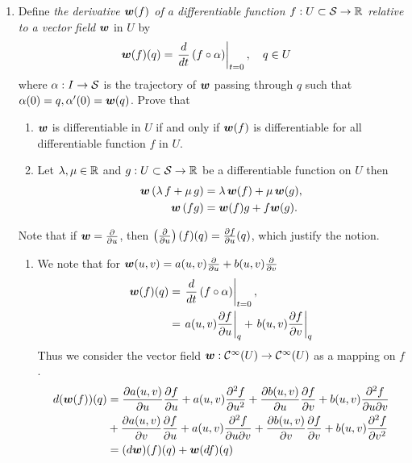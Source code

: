 \documentclass[11pt]{article}
\begin{document}
\begin{enumerate}
\item \begin{example}
Define \emph{the derivative $\boldsymbol{w}(f)$ of a differentiable function $f: U\subset {\mathcal S} \rightarrow {\mathbb R}$ relative to a vector field} $\boldsymbol{w}$ in $U$ by 
\begin{align*}
\boldsymbol{w}(f)(q) &= \left.{\frac{d}{dt}\left(f\circ \alpha\right)}\right\vert_{t=0},\quad q\in U
\end{align*}
where $\alpha: I\rightarrow {\mathcal S}$ is the trajectory of $\boldsymbol{w}$ passing through $q$ such that $\alpha(0) = q, \alpha'(0)=\boldsymbol{w}(q)$. Prove that 
\begin{enumerate}
\item $\boldsymbol{w}$ is differentiable in $U$ if and only if $\boldsymbol{w}(f)$ is differentiable for all differentiable function $f$ in $U$.
\item Let $\lambda, \mu\in {\mathbb R}$ and $g: U\subset {\mathcal S} \rightarrow {\mathbb R}$ be a differentiable function on $U$ then 
\begin{align*}
\boldsymbol{w}\left(\lambda\,f+ \mu\, g\right) &= \lambda\,\boldsymbol{w}(f) + \mu\,\boldsymbol{w}(g),\\
\boldsymbol{w}\left(fg\right) &= \boldsymbol{w}(f)g +f\boldsymbol{w}(g).
\end{align*}
\end{enumerate}
\end{example}
Note that if $\boldsymbol{w} = \frac{\partial }{ \partial u}$, then $\left(\frac{\partial }{ \partial u}\right)(f)(q) = \frac{\partial f}{ \partial u}(q)$, which justify the notion.

\begin{solution}
\begin{enumerate}
\item We note that for $\boldsymbol{w}(u,v) = a(u,v)\frac{\partial }{ \partial u}+ b(u,v)\frac{\partial }{ \partial v}$
\begin{align*}
\boldsymbol{w}(f)(q) &= \left.{\frac{d}{dt}\left(f\circ \alpha\right)}\right\vert_{t=0},\\
&= \left.{a(u,v)\frac{\partial f}{ \partial u}}\right\vert_{q} + \left.{b(u,v)\frac{\partial f}{ \partial v}}\right\vert_{q} 
\end{align*}
Thus we consider the vector field $\boldsymbol{w}: \mathcal{C}^{\infty}(U) \rightarrow \mathcal{C}^{\infty}(U) $ as a mapping on $f$.
\begin{align*}
d(\boldsymbol{w}(f))(q) &= \frac{\partial a(u,v)}{ \partial u}\frac{\partial f}{ \partial u}+ a(u,v)\frac{\partial ^{2}f}{ \partial u^{2}}+ \frac{\partial b(u,v)}{ \partial u}\frac{\partial f}{ \partial v}+ b(u,v)\frac{\partial ^{2}f}{ \partial u\partial v}\\
&+\frac{\partial a(u,v)}{ \partial v}\frac{\partial f}{ \partial u}+ a(u,v)\frac{\partial ^{2}f}{ \partial u\partial v}+ \frac{\partial b(u,v)}{ \partial v}\frac{\partial f}{ \partial v}+ b(u,v)\frac{\partial ^{2}f}{ \partial v^{2}}\\
&= (d\boldsymbol{w})(f)(q) + \boldsymbol{w}(df)(q)
\end{align*}





\end{enumerate}
\end{solution}
\end{enumerate}
\end{document}
